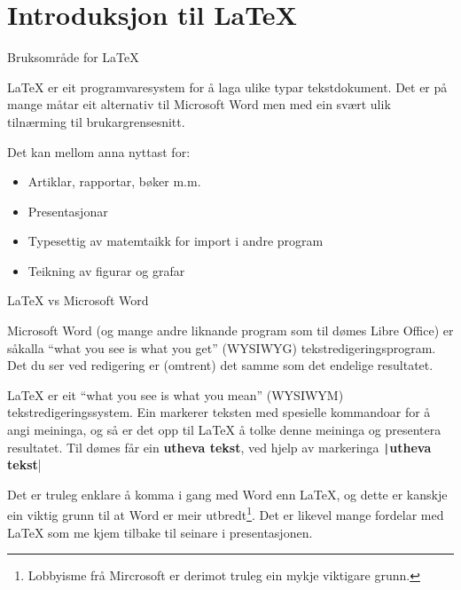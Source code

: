 \section{Introduksjon til \LaTeX}

\begin{frame}{Bruksområde for \LaTeX}
	
	\LaTeX{} er eit programvaresystem for å laga ulike typar tekstdokument. Det er på mange måtar eit alternativ til Microsoft Word men med ein svært ulik tilnærming til brukargrensesnitt.
	
	Det kan mellom anna nyttast for:
	
	\begin{itemize}
		\item Artiklar, rapportar, bøker m.m.
		\item Presentasjonar
		\item Typesettig av matemtaikk for import i andre program
		\item Teikning av figurar og grafar
	\end{itemize}
	
\end{frame}


	\begin{frame}{\LaTeX{} vs Microsoft Word}
	
	Microsoft Word (og mange andre liknande program som til dømes Libre Office) er såkalla ``what you see is what you get'' (WYSIWYG) tekstredigeringsprogram. Det du ser ved redigering er (omtrent) det samme som det endelige resultatet. %
	
	\LaTeX{} er eit ``what you see is what you mean'' (WYSIWYM) tekstredigeringssystem. Ein markerer teksten med spesielle kommandoar for å angi meininga, og så er det opp til \LaTeX{} å tolke denne meininga og presentera resultatet. Til dømes får ein \textbf{utheva tekst}, ved hjelp av markeringa \texttt|\textbf{utheva tekst}|
	
	Det er truleg enklare å komma i gang med Word enn \LaTeX{}, og dette er kanskje ein viktig grunn til at Word er meir utbredt\footnote{Lobbyisme frå Mircrosoft er derimot truleg ein mykje viktigare grunn.}. Det er likevel mange fordelar med \LaTeX{} som me kjem tilbake til seinare i presentasjonen.
	
\end{frame}

